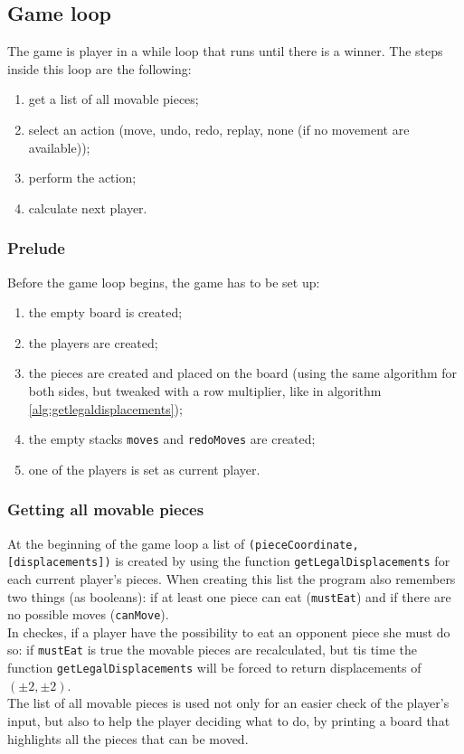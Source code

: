 \documentclass[10pt, a4paper]{article}
\begin{document}
	\subsection{Game loop}
	The game is player in a while loop that runs until there is a winner. The steps inside this loop are the following:
	\begin{enumerate}
		\item get a list of all movable pieces;
		\item select an action (move, undo, redo, replay, none (if no movement are available));
		\item perform the action;
		\item calculate next player.
	\end{enumerate}
	
	\subsubsection{Prelude}
	\label{subsubsec:prelude}
	Before the game loop begins, the game has to be set up:
	\begin{enumerate}
		\item the empty board is created;
		\item the players are created;
		\item the pieces are created and placed on the board (using the same algorithm for both sides, but tweaked with a row multiplier, like in algorithm \ref{alg:getlegaldisplacements});
		\item the empty stacks \texttt{moves} and \texttt{redoMoves} are created;
		\item one of the players is set as current player.
	\end{enumerate}
	
	\subsubsection{Getting all movable pieces}
	At the beginning of the game loop a list of \texttt{(pieceCoordinate, [displacements])} is created by using the function \texttt{getLegalDisplacements} for each current player's pieces. When creating this list the program also remembers two things (as booleans): if at least one piece can eat (\texttt{mustEat}) and if there are no possible moves (\texttt{canMove}).\\
	In checkes, if a player have the possibility to eat an opponent piece she must do so: if \texttt{mustEat} is true the movable pieces are recalculated, but tis time the function \texttt{getLegalDisplacements} will be forced to return displacements of \((\pm2, \pm2)\).\\
	The list of all movable pieces is used not only for an easier check of the player's input, but also to help the player deciding what to do, by printing a board that highlights all the pieces that can be moved.
	
\end{document}
